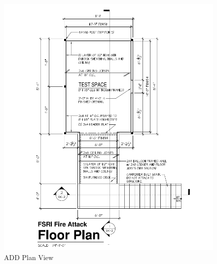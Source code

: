 \documentclass{article}
\begin{document}
\begin{figure}[!ht]
	\centering
	\includegraphics[width=\columnwidth]{Figures/Water_Distribution/ADDtopviewprint}
	\caption{ADD Plan View}
	\label{fig:ADD_Top_View}
\end{figure}
\end{document}
